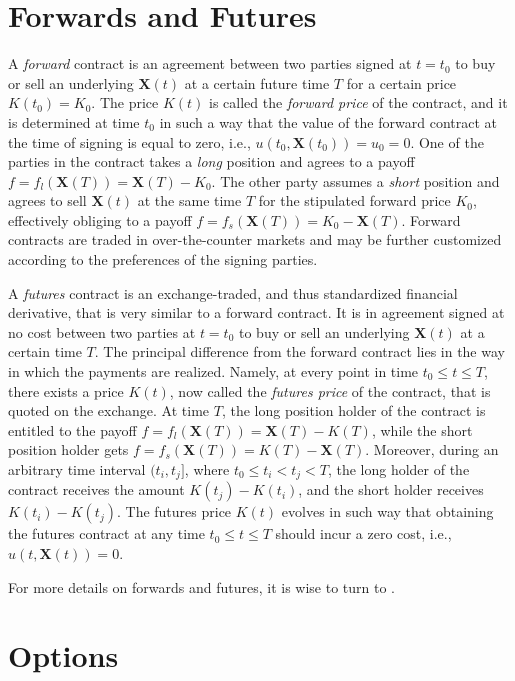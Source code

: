 \documentclass{UUThesisTemplate}
\begin{document}
\section{Forwards and Futures}
\label{sec:futures}
\par A \emph{forward} contract is an agreement between two parties signed at $t=t_0$ to buy or sell an underlying $\mathbf{X}(t)$ at a certain future time $T$ for a certain price $K(t_0)=K_0$. The price $K(t)$ is called the \emph{forward price} of the contract, and it is determined at time $t_0$ in such a way that the value of the forward contract at the time of signing is equal to zero, i.e., $u(t_0,\mathbf{X}(t_0))=u_0=0$. One of the parties in the contract takes a \emph{long} position and agrees to a payoff $f=f_l(\mathbf{X}(T))=\mathbf{X}(T)-K_0$. The other party assumes a \emph{short} position and agrees to sell $\mathbf{X}(t)$ at the same time $T$ for the stipulated forward price $K_0$, effectively obliging to a payoff $f=f_s(\mathbf{X}(T))=K_0-\mathbf{X}(T)$. Forward contracts are traded in over-the-counter markets and may be further customized according to the preferences of the signing parties.
\par A \emph{futures} contract is an exchange-traded, and thus standardized financial derivative, that is very similar to a forward contract. It is in agreement signed at no cost between two parties at $t=t_0$ to buy or sell an underlying $\mathbf{X}(t)$ at a certain time $T$. The principal difference from the forward contract lies in the way in which the payments are realized. Namely, at every point in time $t_0 \leq t \leq T$, there exists a price $K(t)$, now called the \emph{futures price} of the contract, that is quoted on the exchange. At time $T$, the long position holder of the contract is entitled to the payoff $f=f_l(\mathbf{X}(T))=\mathbf{X}(T)-K(T)$, while the short position holder gets $f=f_s(\mathbf{X}(T))=K(T)-\mathbf{X}(T)$. Moreover, during an arbitrary time interval $(t_i,t_j]$, where $t_0 \leq t_i < t_j < T$, the long holder of the contract receives the amount $K(t_j)-K(t_i)$, and the short holder receives $K(t_i)-K(t_j)$. The futures price $K(t)$ evolves in such way that obtaining the futures contract at any time $t_0 \leq t \leq T$ should incur a zero cost, i.e., $u(t,\mathbf{X}(t))=0$. 
\par For more details on forwards and futures, it is wise to turn to \cite{hull2017options,duffie1989futures}.
\section{Options}
\label{sec:options}
%
%
\end{document}

